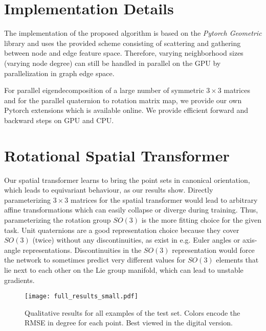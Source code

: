 \documentclass[10pt,twocolumn,letterpaper]{article}
\begin{document}
\section{Implementation Details}
\label{sec:implementation}
The implementation of the proposed algorithm is based on the \emph{Pytorch Geometric} library \cite{Fey:2019} and uses the provided scheme consisting of scattering and gathering between node and edge feature space. Therefore, varying neighborhood sizes (\eg varying node degree) can still be handled in parallel on the GPU by parallelization in graph edge space.

For parallel eigendecomposition of a large number of symmetric $3\times3$ matrices and for the parallel quaternion to rotation matrix map, we provide our own Pytorch extensions which is available online. We provide efficient forward and backward steps on GPU and CPU.


\section{Rotational Spatial Transformer}
\label{sec:transformer}
Our spatial transformer learns to bring the point sets in canonical orientation, which leads to equivariant behaviour, as our results show. Directly parameterizing $3\times 3$ matrices for the spatial transformer would lead to arbitrary affine transformations which
can easily collapse or diverge during training. Thus, parameterizing the rotation group $SO(3)$ is the more fitting choice for the given
task. Unit quaternions are a good representation choice because they cover $SO(3)$ (twice) without any discontinuities, as exist in e.g. Euler angles or axis-angle representations. Discontinuities in the $SO(3)$ representation would
force the network to sometimes predict very different values for $SO(3)$ elements that lie next to each other on the
Lie group manifold, which can lead to unstable gradients.





\begin{figure*}[t]
\centering
  \texttt{[image: full\_results\_small.pdf]}
  \caption{Qualitative results for all examples of the test set. Colors encode the RMSE in degree for each point. Best viewed in the digital version.}
  \label{fig:qualitative}
\end{figure*}
\end{document}
